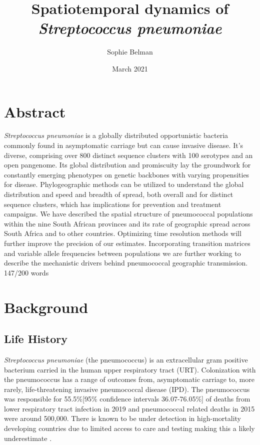 \documentclass{article}
\title{Spatiotemporal dynamics of \textit{Streptococcus pneumoniae}}
\author{Sophie Belman}
\date{March 2021}
\begin{document}
\maketitle

\section{Abstract}
\textit{Streptococcus pneumoniae} is a globally distributed opportunistic bacteria commonly found in asymptomatic carriage but can cause invasive disease. It's diverse, comprising over 800 distinct sequence clusters with 100 serotypes and an open pangenome. Its global distribution and promiscuity lay the groundwork for constantly emerging phenotypes on genetic backbones with varying propensities for disease. Phylogeographic methods can be utilized to understand the global distribution and speed and breadth of spread, both overall and for distinct sequence clusters, which has implications for prevention and treatment campaigns. We have described the spatial structure of pneumococcal populations within the nine South African provinces and its rate of geographic spread across South Africa and to other countries. Optimizing time resolution methods will further improve the precision of our estimates. Incorporating transition matrices and variable allele frequencies between populations we are further working to describe the mechanistic drivers behind pneumococcal geographic transmission. 
147/200 words
\section{Background}
\subsection{Life History}
\textit{Streptococcus pneumoniae} (the pneumococcus) is an extracellular gram positive bacterium carried in the human upper respiratory tract (URT). Colonization with the pneumococcus has a range of outcomes from, asymptomatic carriage to, more rarely, life-threatening invasive pneumococcal disease (IPD)\cite{weiserStreptococcusPneumoniaeTransmission2018}. The pneumococcus was responsible for 55.5\%[95\% confidence intervals 36.07-76.05\%] of deaths from lower respiratory tract infection in 2019 and pneumococcal related deaths in 2015 were around 500,000\cite{wahlBurdenStreptococcusPneumoniae2018,murrayFiveInsightsGlobal2020}. There is known to be under detection in high-mortality developing countries due to limited access to care and testing making this a likely underestimate \cite{obrienBurdenDiseaseCaused2009,troegerEstimatesGlobalRegional2017}. 
\end{document}
